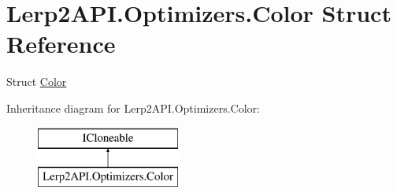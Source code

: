 \hypertarget{struct_lerp2_a_p_i_1_1_optimizers_1_1_color}{}\section{Lerp2\+A\+P\+I.\+Optimizers.\+Color Struct Reference}
\label{struct_lerp2_a_p_i_1_1_optimizers_1_1_color}


Struct \hyperlink{struct_lerp2_a_p_i_1_1_optimizers_1_1_color}{Color}  


Inheritance diagram for Lerp2\+A\+P\+I.\+Optimizers.\+Color\+:\begin{figure}[H]
\begin{center}
\leavevmode
\includegraphics[height=2.000000cm]{struct_lerp2_a_p_i_1_1_optimizers_1_1_color}
\end{center}
\end{figure}

